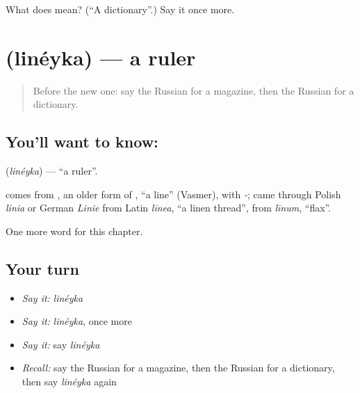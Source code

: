 \begin{tcolorbox}[breakable,colback=teal!4,colframe=teal!35!black,title={Before you move on}]
What does  mean? (\textquotedblleft{}A dictionary\textquotedblright{}.) Say it once more.
\end{tcolorbox}
\section[\texorpdfstring{\ru{линейка} (linéyka)}{линейка (linéyka)}]{ (linéyka) — a ruler}

\label{lesson:RU-C192-lineyka}



\begin{quote}
Before the new one: say the Russian for a magazine, then the Russian for a dictionary.
\end{quote}

\subsection*{You'll want to know: }
\textbf{} (\emph{linéyka}) — \textquotedblleft{}a ruler\textquotedblright{}.

\begin{cousinweb}
\textbf{} comes from \emph{}, an older form of \emph{}, \textquotedblleft{}a line\textquotedblright{} (Vasmer), with \emph{-}; \emph{} came through Polish \emph{linia} or German \emph{Linie} from Latin \emph{līnea}, \textquotedblleft{}a linen thread\textquotedblright{}, from \emph{līnum}, \textquotedblleft{}flax\textquotedblright{}.
\end{cousinweb}

\begin{grammarlens}[title={What you've built}]
One more word for this chapter.
\end{grammarlens}

\subsection*{Your turn}
\begin{itemize}
\raggedright
  \item \emph{Say it:} \emph{linéyka}
  \item \emph{Say it:} \emph{linéyka}, once more
  \item \emph{Say it:} say \emph{linéyka}
  \item \emph{Recall:} say the Russian for a magazine, then the Russian for a dictionary, then say \emph{linéyka} again
\end{itemize}


